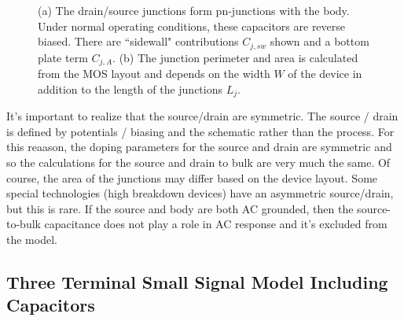 \begin{figure}[tb]
\begin{center}
\end{center}
\caption{(a) The drain/source junctions form pn-junctions with the body.  Under normal operating conditions, these capacitors are reverse biased.  There are ``sidewall" contributions $C_{j,sw}$ shown and a bottom plate term $C_{j,A}$.  (b)  The junction perimeter and area is calculated from the MOS layout and depends on the width $W$ of the device in addition to the length of the junctions $L_j$.} 
\end{figure}


It's important to realize that the source/drain are symmetric.  The source / drain is defined by potentials / biasing and the schematic rather than the process. For this reaason, the doping parameters for the source and drain are symmetric and so the calculations for the source and drain to bulk are very much the same.  Of course, the area of the junctions may differ based on the device layout.	Some special technologies (high breakdown devices) have an asymmetric source/drain, but this is rare.	 If the source and body are both AC grounded, then the source-to-bulk capacitance does not play a role in AC response and it's excluded from the model.

\subsection{Three Terminal Small Signal Model Including Capacitors}


